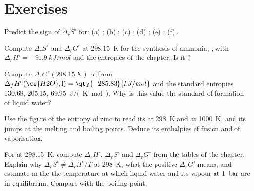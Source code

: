 \section{Exercises}

\begin{exercise}[$\star$]\label{exo:b2:reaction-free-energy:1}
Predict the sign of $\Delta_r S^\circ$ for: (a) ;
(b) ; (c) ;
(d) ; (e) ;
(f) .
\end{exercise}

\begin{exercise}[$\star$]\label{exo:b2:reaction-free-energy:2}
Compute $\Delta_r S^\circ$ and $\Delta_r G^\circ$ at \qty{298.15}{K} for the
synthesis of ammonia, , with $\Delta_r
H^\circ = \qty{-91.9}{kJ/mol}$ and the entropies of the chapter. Is it
?
\end{exercise}

\begin{exercise}[$\star$]\label{exo:b2:reaction-free-energy:3}
Compute $\Delta_r G^\circ(\qty{298.15}{K})$ of  from $\Delta_f H^\circ(\ce{H2O}, \text{l}) = \qty{-285.83}{kJ/mol}$
and the standard entropies  130.68,  205.15,
 \qty{69.95}{J/(K.mol)}. Why is this value the standard  of formation of liquid water?
\end{exercise}

\begin{exercise}[$\star$]\label{exo:b2:reaction-free-energy:4}
Use the figure of the entropy of zinc to read its  at
\qty{298}{K} and at \qty{1000}{K}, and its jumps at the melting and boiling
points. Deduce its enthalpies of fusion and of vaporisation.
\end{exercise}

\begin{exercise}[$\star\star$]\label{exo:b2:reaction-free-energy:5}
For  at \qty{298.15}{K}, compute $\Delta_r H^\circ$,
$\Delta_r S^\circ$ and $\Delta_r G^\circ$ from the tables of the chapter.
Explain why $\Delta_r S^\circ \neq \Delta_r H^\circ/T$ at \qty{298}{K}, what
the positive $\Delta_r G^\circ$ means, and estimate in the  the temperature at which liquid water and its vapour at
\qty{1}{bar} are in equilibrium. Compare with the boiling point.
\end{exercise}

